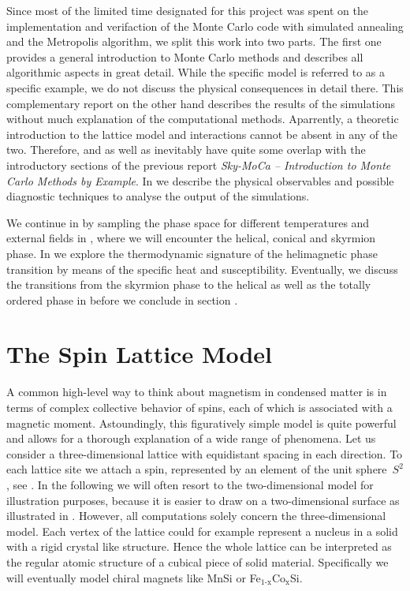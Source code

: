 Since most of the limited time designated for this project was spent on the
implementation and verifaction of the Monte Carlo code with simulated annealing
and the Metropolis algorithm, we split this work into two parts. The first one
provides a general introduction to Monte Carlo methods and describes all
algorithmic aspects in great detail. While the specific model is referred to as
a specific example, we do not discuss the physical consequences in detail there.
This complementary report on the other hand describes the results of the
simulations without much explanation of the computational methods. Aparrently, a
theoretic introduction to the lattice model and interactions cannot be absent in
any of the two. Therefore,  and  as
well as  inevitably have quite some overlap with the
introductory sections of the previous report \emph{Sky-MoCa -- Introduction to
Monte Carlo Methods by Example}. In  we describe the
physical observables and possible diagnostic techniques to analyse the output of
the simulations.

We continue in  by sampling the phase space for different
temperatures and external fields in , where we will encounter
the helical, conical and skyrmion phase. In  we explore the
thermodynamic signature of the helimagnetic phase transition by means of the
specific heat and susceptibility. Eventually, we discuss the transitions from
the skyrmion phase to the helical as well as the totally ordered phase in
 before we conclude in section .
%
\section{The Spin Lattice Model}\label{sec:lattice}
%
A common high-level way to think about magnetism in condensed matter is in terms
of complex collective behavior of spins, each of which is associated with a
magnetic moment. Astoundingly, this figuratively simple model is quite powerful
and allows for a thorough explanation of a wide range of phenomena. Let us
consider a three-dimensional lattice with equidistant spacing in each direction.
To each lattice site we attach a spin, represented by an element of the unit
sphere~$S^2$, see . In the following we will often resort to the
two-dimensional model for illustration purposes, because it is easier to draw on
a two-dimensional surface as illustrated in . However, all
computations solely concern the three-dimensional model. Each vertex of the
lattice could for example represent a nucleus in a solid with a rigid crystal
like structure. Hence the whole lattice can be interpreted as the regular atomic
structure of a cubical piece of solid material. Specifically we will eventually
model chiral magnets like MnSi or Fe$_\text{1-x}$Co$_\text{x}$Si.

